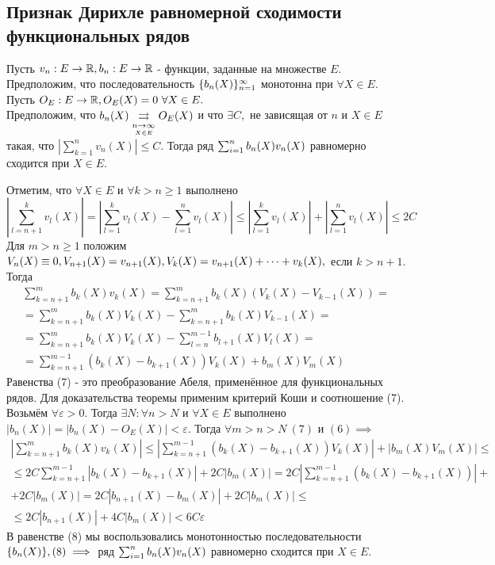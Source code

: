 \documentclass[main]{subfiles}
\begin{document}
\subsection{Признак Дирихле равномерной сходимости функциональных рядов}
\begin{theorem} 
    Пусть $v_n:E\to{\vR}, b_n:E\to{\vR}$ - функции, заданные на множестве $E.$
     Предположим, что последовательность $\fnn[b_n(X)]$ монотонна при $\forall X\in E.
     $ Пусть $O_E:E\to{\vR}, O_E(X)=0\ \forall X\in E.$\\
Предположим, что $b_n(X)\darrow{\underset{X\in E}{n\to\infty}}O_E(X)$ 
и что $\exists C,$ не зависящая от $n$ и $X\in E$ такая, что $|\sum_{k=1}^n v_n(X)|\leq C.$ 
Тогда ряд $\sumn b_n(X)v_n(X)$ равномерно сходится при $X\in E.$ \end{theorem}
\begin{longProof} 
    Отметим, что $\forall X\in E$ и $\forall k>n\geq 1$ выполнено
     \[ |\sum_{l=n+1}^k v_l(X)|=|\sum_{l=1}^k v_l(X)-\sum_{l=1}^n v_l(X)|\leq
      |\sum_{l=1}^k v_l(X)|+|\sum_{l=1}^n v_l(X)|\leq 2C\tag{6} \]
Для $m>n\geq 1$ положим $V_n(X)\equiv0, V_{n+1}(X)=v_{n+1}(X),\\
 V_k(X)=v_{n+1}(X)
+\dots+v_k(X),$ если $k>n+1.$ Тогда
\begin{multline*}
 \sum_{k=n+1}^m b_k(X)v_k(X)=\sum_{k=n+1}^m b_k(X)(V_k(X)-V_{k-1}(X))= \\
=\sum_{k=n+1}^m b_k(X)V_k(X)-\sum_{k=n+1}^m b_k(X)V_{k-1}(X)= \\
=\sum_{k=n+1}^m b_k(X)V_k(X)-\sum_{l=n}^{m-1} b_{l+1}(X)V_l(X)= \\
=\sum_{k=n+1}^{m-1}(b_k(X)-b_{k+1}(X))V_k(X)+b_m(X)V_m(X)\tag{7} \end{multline*}
Равенства (7) - это преобразование Абеля, применённое для функциональных рядов. 
Для доказательства теоремы применим критерий Коши и соотношение (7). \\
Возьмём $\forall\varepsilon>0.$ Тогда $\exists N:\forall n>N$ и $\forall X\in E$ 
выполнено\\ $|b_n(X)|=|b_n(X)-O_E(X)|<\varepsilon.$ Тогда $\forall m>n>N\ (7)$ и
 $(6) \implies$
 \begin{multline*}
  |\sum_{k=n+1}^m b_k(X)v_k(X)|\leq |\sum_{k=n+1}^{m-1}(b_k(X)-b_{k+1}(X))V_k(X)|+|b_m(X)V_m(X)|\leq \\
\leq 2C\sum_{k=n+1}^{m-1}|b_k(X)-b_{k+1}(X)|+2C|b_m(X)|=2C|\sum_{k=n+1}^{m-1}(b_k(X)-b_{k+1}(X))|+ \\
+ 2C|b_m(X)|=2C|b_{n+1}(X)-b_m(X)|+2C|b_m(X)|\leq \\
 \leq 2C|b_{n+1}(X)|+4C|b_m(X)|<6C\varepsilon\tag{8} 
\end{multline*}
В равенстве (8) мы воспользовались монотонностью последовательности
 $\fn[b_n(X)], (8) \implies $ ряд $\sumn b_n(X)v_n(X)$ равномерно сходится при $X\in E.$ 
\end{longProof}
\end{document}

